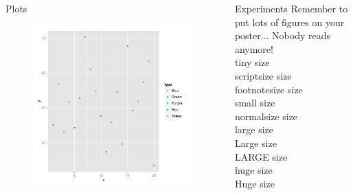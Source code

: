 \documentclass[final,t]{beamer}
\begin{document}
\begin{frame}{}
\begin{columns}[t]
\begin{column}{0.32\linewidth}
      \begin{block}{Plots}
        \begin{figure}[htb]
        \includegraphics[width=.6\columnwidth]{beamerpostertest-fig2}
        \end{figure}
      \end{block}
      
    \end{column}%

    \begin{column}{0.32\linewidth}

      \begin{block}{Experiments}
        Remember to put lots of figures on your poster... Nobody reads anymore!
        \\
        {\tiny tiny size}\\
        {\scriptsize scriptsize size}\\
        {\footnotesize footnotesize size}\\
        {\small small size}\\
        {\normalsize normalsize size}\\
        {\large large size}\\
        {\Large Large size}\\
        {\LARGE LARGE size}\\
        {\huge huge size}\\
        {\Huge Huge size}\\
        
      \end{block}

\end{column}
\end{columns}
\end{frame}
\end{document}
